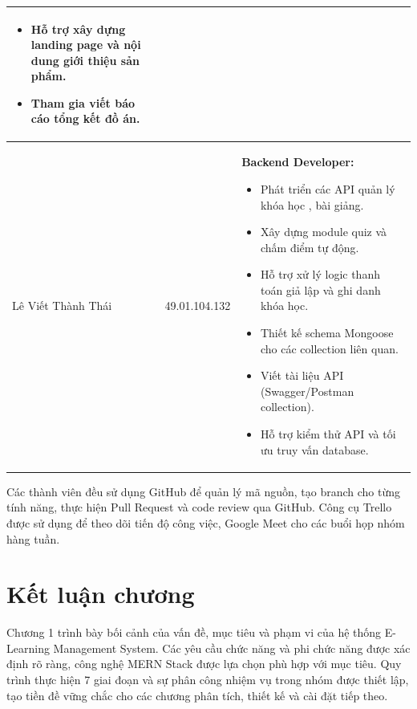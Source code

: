 \begin{table}[H]
\begin{tabular}{|p{3.2cm}|p{2.3cm}|p{9cm}|}
\begin{itemize}[leftmargin=*, nosep]
    \item Hỗ trợ xây dựng landing page và nội dung giới thiệu sản phẩm.
    \item Tham gia viết báo cáo tổng kết đồ án.
\end{itemize} \\ \hline
Lê Viết Thành Thái & 49.01.104.132 & \textbf{Backend Developer:}
\begin{itemize}[leftmargin=*, nosep]
    \item Phát triển các API quản lý khóa học , bài giảng.
    \item Xây dựng module quiz và chấm điểm tự động.
    \item Hỗ trợ xử lý logic thanh toán giả lập và ghi danh khóa học.
    \item Thiết kế schema Mongoose cho các collection liên quan.
    \item Viết tài liệu API (Swagger/Postman collection).
    \item Hỗ trợ kiểm thử API và tối ưu truy vấn database.
\end{itemize} \\ \hline
\end{tabular}
\end{table}

Các thành viên đều sử dụng GitHub để quản lý mã nguồn, tạo branch cho từng tính năng, thực hiện Pull Request và code review qua GitHub. Công cụ Trello được sử dụng để theo dõi tiến độ công việc, Google Meet cho các buổi họp nhóm hàng tuần.

\section{Kết luận chương}
Chương 1 trình bày bối cảnh của vấn đề, mục tiêu và phạm vi của hệ thống E-Learning Management System. Các yêu cầu chức năng và phi chức năng được xác định rõ ràng, công nghệ MERN Stack được lựa chọn phù hợp với mục tiêu. Quy trình thực hiện 7 giai đoạn và sự phân công nhiệm vụ trong nhóm được thiết lập, tạo tiền đề vững chắc cho các chương phân tích, thiết kế và cài đặt tiếp theo.

